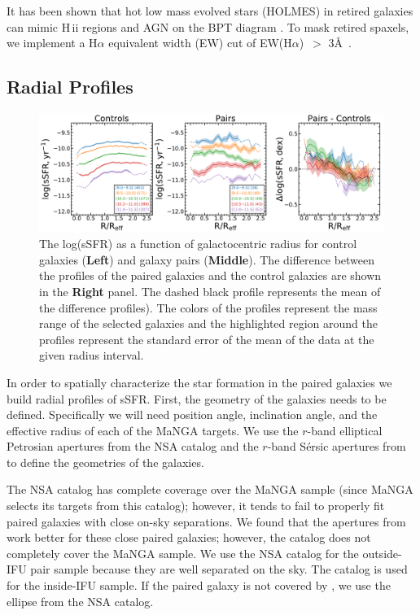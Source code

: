 \documentclass[iop,revtex4,twocolumn,apj,numberedappendix,appendixfloats]{emulateapj}
\newcommand{\ewha}{EW(H$\alpha$)}
\begin{document}
It has been shown that hot low mass evolved stars (HOLMES) in retired galaxies can mimic H\,{\sc ii} regions and AGN on the BPT diagram \citep{Stasinska:2008}. To mask retired spaxels, we implement a H$\alpha$ equivalent width (EW) cut of \ewha\ $>$ 3\AA\ \citep{Cid-Fernandes:2011}. 

\subsection{Radial Profiles}\label{sec:radial}

\begin{figure}
\centering
\includegraphics[width=\linewidth]{fig/ssfr_comb.pdf}
\caption[]{The log(sSFR) as a function of galactocentric radius for control galaxies (\textbf{Left}) and galaxy pairs (\textbf{Middle}). The difference between the profiles of the paired galaxies and the control galaxies are shown in the \textbf{Right} panel. The dashed black profile represents the mean of the difference profiles). The colors of the profiles represent the mass range of the selected galaxies and the highlighted region around the profiles represent the standard error of the mean of the data at the given radius interval.}
\label{fig:ssfr_prof}
\end{figure}

In order to spatially characterize the star formation in the paired galaxies we build radial profiles of sSFR. First, the geometry of the galaxies needs to be defined. Specifically we will need position angle, inclination angle, and the effective radius of each of the MaNGA targets. We use the $r$-band elliptical Petrosian apertures from the NSA catalog and the $r$-band S\'ersic apertures from \citet{Simard:2011} to define the geometries of the galaxies. 

The NSA catalog has complete coverage over the MaNGA sample (since MaNGA selects its targets from this catalog); however, it tends to fail to properly fit paired galaxies with close on-sky separations. We found that the apertures from \citet{Simard:2011} work better for these close paired galaxies; however, the catalog does not completely cover the MaNGA sample. We use the NSA catalog for the outside-IFU pair sample because they are well separated on the sky. The \citet{Simard:2011} catalog is used for the inside-IFU sample. If the paired galaxy is not covered by \citet{Simard:2011}, we use the ellipse from the NSA catalog. 
\end{document}

